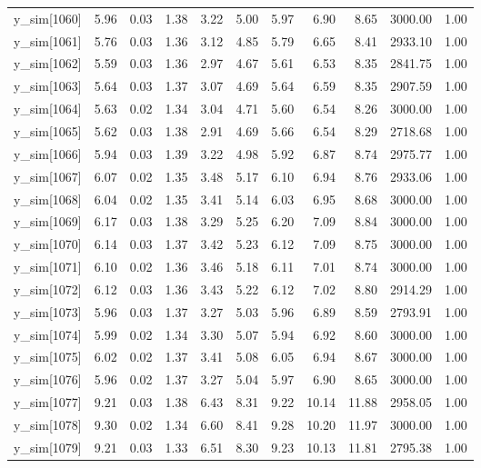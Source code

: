 \begin{table}[ht]
\begin{tabular}{rrrrrrrrrrr}
  y\_sim[1060] & 5.96 & 0.03 & 1.38 & 3.22 & 5.00 & 5.97 & 6.90 & 8.65 & 3000.00 & 1.00 \\ 
  y\_sim[1061] & 5.76 & 0.03 & 1.36 & 3.12 & 4.85 & 5.79 & 6.65 & 8.41 & 2933.10 & 1.00 \\ 
  y\_sim[1062] & 5.59 & 0.03 & 1.36 & 2.97 & 4.67 & 5.61 & 6.53 & 8.35 & 2841.75 & 1.00 \\ 
  y\_sim[1063] & 5.64 & 0.03 & 1.37 & 3.07 & 4.69 & 5.64 & 6.59 & 8.35 & 2907.59 & 1.00 \\ 
  y\_sim[1064] & 5.63 & 0.02 & 1.34 & 3.04 & 4.71 & 5.60 & 6.54 & 8.26 & 3000.00 & 1.00 \\ 
  y\_sim[1065] & 5.62 & 0.03 & 1.38 & 2.91 & 4.69 & 5.66 & 6.54 & 8.29 & 2718.68 & 1.00 \\ 
  y\_sim[1066] & 5.94 & 0.03 & 1.39 & 3.22 & 4.98 & 5.92 & 6.87 & 8.74 & 2975.77 & 1.00 \\ 
  y\_sim[1067] & 6.07 & 0.02 & 1.35 & 3.48 & 5.17 & 6.10 & 6.94 & 8.76 & 2933.06 & 1.00 \\ 
  y\_sim[1068] & 6.04 & 0.02 & 1.35 & 3.41 & 5.14 & 6.03 & 6.95 & 8.68 & 3000.00 & 1.00 \\ 
  y\_sim[1069] & 6.17 & 0.03 & 1.38 & 3.29 & 5.25 & 6.20 & 7.09 & 8.84 & 3000.00 & 1.00 \\ 
  y\_sim[1070] & 6.14 & 0.03 & 1.37 & 3.42 & 5.23 & 6.12 & 7.09 & 8.75 & 3000.00 & 1.00 \\ 
  y\_sim[1071] & 6.10 & 0.02 & 1.36 & 3.46 & 5.18 & 6.11 & 7.01 & 8.74 & 3000.00 & 1.00 \\ 
  y\_sim[1072] & 6.12 & 0.03 & 1.36 & 3.43 & 5.22 & 6.12 & 7.02 & 8.80 & 2914.29 & 1.00 \\ 
  y\_sim[1073] & 5.96 & 0.03 & 1.37 & 3.27 & 5.03 & 5.96 & 6.89 & 8.59 & 2793.91 & 1.00 \\ 
  y\_sim[1074] & 5.99 & 0.02 & 1.34 & 3.30 & 5.07 & 5.94 & 6.92 & 8.60 & 3000.00 & 1.00 \\ 
  y\_sim[1075] & 6.02 & 0.02 & 1.37 & 3.41 & 5.08 & 6.05 & 6.94 & 8.67 & 3000.00 & 1.00 \\ 
  y\_sim[1076] & 5.96 & 0.02 & 1.37 & 3.27 & 5.04 & 5.97 & 6.90 & 8.65 & 3000.00 & 1.00 \\ 
  y\_sim[1077] & 9.21 & 0.03 & 1.38 & 6.43 & 8.31 & 9.22 & 10.14 & 11.88 & 2958.05 & 1.00 \\ 
  y\_sim[1078] & 9.30 & 0.02 & 1.34 & 6.60 & 8.41 & 9.28 & 10.20 & 11.97 & 3000.00 & 1.00 \\ 
  y\_sim[1079] & 9.21 & 0.03 & 1.33 & 6.51 & 8.30 & 9.23 & 10.13 & 11.81 & 2795.38 & 1.00 \\ 

\end{tabular}
\end{table}
